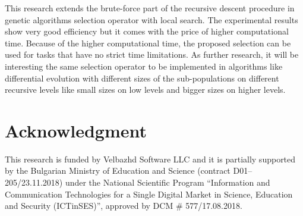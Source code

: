 \documentclass{svproc}
\begin{document}
This research extends the brute-force part of the recursive descent procedure in genetic algorithms selection operator with local search. The experimental results show very good efficiency but it comes with the price of higher computational time. Because of the higher computational time, the proposed selection can be used for tasks that have no strict time limitations. As further research, it will be interesting the same selection operator to be implemented in algorithms like differential evolution \cite{reddy-01} with different sizes of the sub-populations \cite{koumousis-01} on different recursive levels like small sizes on low levels and bigger sizes on higher levels. 

\section*{Acknowledgment}

This research is funded by Velbazhd Software LLC and it is partially supported by the Bulgarian Ministry of Education and Science (contract D01–205/23.11.2018) under the National Scientific Program ``Information and Communication Technologies for a Single Digital Market in Science, Education and Security (ICTinSES)'', approved by DCM \# 577/17.08.2018.
\end{document}
